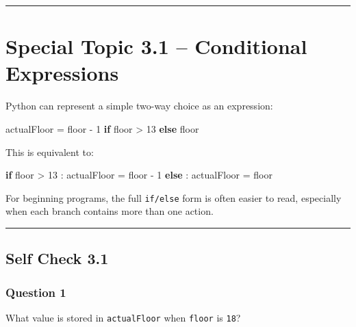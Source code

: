 \documentclass[
  11pt,
  a4paper,
]{article}
\newenvironment{Shaded}{}{}
\newcommand{\ControlFlowTok}[1]{\textcolor[rgb]{0.00,0.44,0.13}{\textbf{#1}}}
\newcommand{\DecValTok}[1]{\textcolor[rgb]{0.25,0.63,0.44}{#1}}
\newcommand{\NormalTok}[1]{#1}
\newcommand{\OperatorTok}[1]{\textcolor[rgb]{0.40,0.40,0.40}{#1}}
\begin{document}
\begin{center}\rule{0.5\linewidth}{0.5pt}\end{center}

\section{Special Topic 3.1 -- Conditional
Expressions}\label{special-topic-3.1-conditional-expressions}

Python can represent a simple two-way choice as an expression:

\begin{Shaded}
\begin{Highlighting}[]
\NormalTok{actualFloor }\OperatorTok{=}\NormalTok{ floor }\OperatorTok{{-}} \DecValTok{1} \ControlFlowTok{if}\NormalTok{ floor }\OperatorTok{\textgreater{}} \DecValTok{13} \ControlFlowTok{else}\NormalTok{ floor}
\end{Highlighting}
\end{Shaded}

This is equivalent to:

\begin{Shaded}
\begin{Highlighting}[]
\ControlFlowTok{if}\NormalTok{ floor }\OperatorTok{\textgreater{}} \DecValTok{13}\NormalTok{ :}
\NormalTok{    actualFloor }\OperatorTok{=}\NormalTok{ floor }\OperatorTok{{-}} \DecValTok{1}
\ControlFlowTok{else}\NormalTok{ :}
\NormalTok{    actualFloor }\OperatorTok{=}\NormalTok{ floor}
\end{Highlighting}
\end{Shaded}

For beginning programs, the full \texttt{if/else} form is often easier
to read, especially when each branch contains more than one action.

\begin{center}\rule{0.5\linewidth}{0.5pt}\end{center}

\subsection{Self Check 3.1}\label{self-check-3.1}

\subsubsection{Question 1}\label{question-1}

What value is stored in \texttt{actualFloor} when \texttt{floor} is
\texttt{18}?
\end{document}
